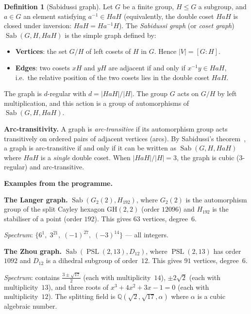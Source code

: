 \documentclass[11pt,a4paper]{article}
\theoremstyle{plain}
\theoremstyle{definition}
\newtheorem{definition}[theorem]{Definition}
\newcommand{\Q}{\mathbb{Q}}
\newcommand{\Sab}{\operatorname{Sab}}
\newcommand{\PSL}{\operatorname{PSL}}
\newcommand{\GH}{\mathrm{GH}}
\begin{document}
\begin{tcolorbox}[breakable, colback=green!8, colframe=green!8,
  boxrule=0pt, sharp corners]
\begin{definition}[Sabidussi graph]
\label{def:sabidussi}
Let $G$ be a finite group, $H \leq G$ a subgroup, and $a \in G$ an
element satisfying $a^{-1} \in HaH$ (equivalently, the double coset
$HaH$ is closed under inversion: $HaH = Ha^{-1}H$). The
\emph{Sabidussi graph} (or \emph{coset graph})
$\Sab(G, H, HaH)$ is the simple graph defined by:
\begin{itemize}
\item \textbf{Vertices}: the set $G/H$ of left cosets of $H$ in $G$.
  Hence $|V| = [G : H]$.
\item \textbf{Edges}: two cosets $xH$ and $yH$ are adjacent if and
  only if $x^{-1}y \in HaH$, i.e.\ the relative position of the two
  cosets lies in the double coset $HaH$.
\end{itemize}
The graph is $d$-regular with $d = |HaH|/|H|$. The group $G$ acts on
$G/H$ by left multiplication, and this action is a group of
automorphisms of $\Sab(G, H, HaH)$.
\end{definition}
\end{tcolorbox}

\begin{tcolorbox}[colback=yellow!12, colframe=yellow!12,
  boxrule=0pt, sharp corners]
\textbf{Arc-transitivity.}
A graph is \emph{arc-transitive} if its automorphism group acts
transitively on ordered pairs of adjacent vertices (arcs). By
Sabidussi's theorem~\cite{Sabidussi1964}, a graph is arc-transitive
if and only if it can be written as $\Sab(G, H, HaH)$ where $HaH$ is
a \emph{single} double coset. When $|HaH|/|H| = 3$, the graph is
cubic (3-regular) and arc-transitive.
\end{tcolorbox}

\begin{tcolorbox}[breakable, colback=black!5, colframe=black!5,
  boxrule=0pt, sharp corners]
\textbf{Examples from the programme.}

\medskip
\textbf{The Langer graph.}
$\Sab(G_2(2), H_{192})$, where $G_2(2)$ is the automorphism group
of the split Cayley hexagon $\GH(2,2)$ (order $12096$) and $H_{192}$
is the stabiliser of a point (order $192$). This gives $63$ vertices,
degree~$6$.

\emph{Spectrum}: $\{6^1,\; 3^{21},\; (-1)^{27},\; (-3)^{14}\}$ ---
all integers.

\medskip
\textbf{The Zhou graph.}
$\Sab(\PSL(2,13), D_{12})$, where $\PSL(2,13)$ has order $1092$ and
$D_{12}$ is a dihedral subgroup of order~$12$. This gives $91$
vertices, degree~$6$.

\emph{Spectrum}: contains $\frac{3 \pm \sqrt{17}}{2}$ (each with
multiplicity~$14$), $\pm 2\sqrt{2}$ (each with multiplicity~$13$),
and three roots of $x^3 + 4x^2 + 3x - 1 = 0$ (each with
multiplicity~$12$). The splitting field is
$\Q(\sqrt{2}, \sqrt{17}, \alpha)$ where $\alpha$ is a cubic
algebraic number.
\end{tcolorbox}
\end{document}

